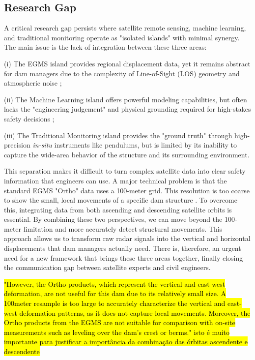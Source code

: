 \documentclass[11pt,a4paper]{article}
\begin{document}
\subsection{Research Gap}

A critical research gap persists where satellite remote sensing, machine learning, and traditional monitoring operate as "isolated islands" with minimal synergy. The main issue is the lack of integration between these three areas: 

(i) The EGMS island provides regional displacement data, yet it remains abstract for dam managers due to the complexity of Line-of-Sight (LOS) geometry and atmospheric noise \parencite{ruiz-armenteros2023}; 

(ii) The Machine Learning island offers powerful modeling capabilities, but often lacks the "engineering judgement" and physical grounding required for high-stakes safety decisions \parencite{salazarAnomalyDetectionDam2021}; 

(iii) The Traditional Monitoring island provides the "ground truth" through high-precision \textit{in-situ} instruments like pendulums, but is limited by its inability to capture the wide-area behavior of the structure and its surrounding environment. 

This separation makes it difficult to turn complex satellite data into clear safety information that engineers can use. A major technical problem is that the standard EGMS "Ortho" data uses a 100-meter grid. This resolution is too coarse to show the small, local movements of a specific dam structure \parencite{ruiz-armenteros2023}. To overcome this, integrating data from both ascending and descending satellite orbits is essential. By combining these two perspectives, we can move beyond the 100-meter limitation and more accurately detect structural movements. This approach allows us to transform raw radar signals into the vertical and horizontal displacements that dam managers actually need. There is, therefore, an urgent need for a new framework that brings these three areas together, finally closing the communication gap between satellite experts and civil engineers.

\hl{\mbox{\parencite{ruiz-armenteros2023}} "However, the Ortho products, which represent the vertical and east-west deformation, are not useful for this dam due to its relatively small size. A 100meter resample is too large to accurately characterize the vertical and east-west deformation patterns, as it does not capture local movements. Moreover, the Ortho products from the EGMS are not suitable for comparison with on-site measurements such as leveling over the dam's crest or berms." isto é muito importante para justificar a importância da combinação das órbitas ascendente e descendente}
\end{document}
